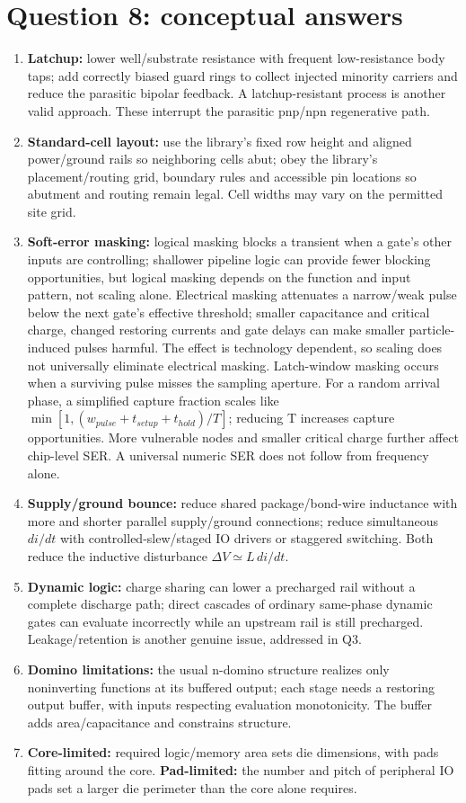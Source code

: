 \documentclass[10pt]{article}
\begin{document}
\section*{Question 8: conceptual answers}
\begin{enumerate}[label=(\alph*),leftmargin=*]
\item \textbf{Latchup:} lower well/substrate resistance with frequent low-resistance body taps; add correctly biased guard rings to collect injected minority carriers and reduce the parasitic bipolar feedback. A latchup-resistant process is another valid approach. These interrupt the parasitic pnp/npn regenerative path.
\item \textbf{Standard-cell layout:} use the library's fixed row height and aligned power/ground rails so neighboring cells abut; obey the library's placement/routing grid, boundary rules and accessible pin locations so abutment and routing remain legal. Cell widths may vary on the permitted site grid.
\item \textbf{Soft-error masking:} logical masking blocks a transient when a gate's other inputs are controlling; shallower pipeline logic can provide fewer blocking opportunities, but logical masking depends on the function and input pattern, not scaling alone. Electrical masking attenuates a narrow/weak pulse below the next gate's effective threshold; smaller capacitance and critical charge, changed restoring currents and gate delays can make smaller particle-induced pulses harmful. The effect is technology dependent, so scaling does not universally eliminate electrical masking. Latch-window masking occurs when a surviving pulse misses the sampling aperture. For a random arrival phase, a simplified capture fraction scales like $\min[1,(w_{pulse}+t_{setup}+t_{hold})/T]$; reducing T increases capture opportunities. More vulnerable nodes and smaller critical charge further affect chip-level SER. A universal numeric SER does not follow from frequency alone.
\item \textbf{Supply/ground bounce:} reduce shared package/bond-wire inductance with more and shorter parallel supply/ground connections; reduce simultaneous $di/dt$ with controlled-slew/staged IO drivers or staggered switching. Both reduce the inductive disturbance $\Delta V\simeq L\,di/dt$.
\item \textbf{Dynamic logic:} charge sharing can lower a precharged rail without a complete discharge path; direct cascades of ordinary same-phase dynamic gates can evaluate incorrectly while an upstream rail is still precharged. Leakage/retention is another genuine issue, addressed in Q3.
\item \textbf{Domino limitations:} the usual n-domino structure realizes only noninverting functions at its buffered output; each stage needs a restoring output buffer, with inputs respecting evaluation monotonicity. The buffer adds area/capacitance and constrains structure.
\item \textbf{Core-limited:} required logic/memory area sets die dimensions, with pads fitting around the core. \textbf{Pad-limited:} the number and pitch of peripheral IO pads set a larger die perimeter than the core alone requires.
\end{enumerate}
\end{document}
